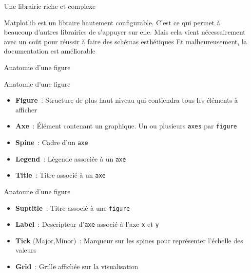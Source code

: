 \begin{frame}{Une librairie riche et complexe}
    \begin{itemize}
        \positem Matplotlib est un libraire hautement configurable. C'est ce qui permet à beaucoup d'autres librairies de s'appuyer sur elle.
        \negitem Mais cela vient nécessairement avec un coût pour réussir à faire des schémas esthétiques
        \negitem Et malheureusement, la documentation est améliorable
    \end{itemize}
    
\end{frame}

\begin{frame}{Anatomie d'une figure}
\end{frame}

\begin{frame}{Anatomie d'une figure}
    \begin{minipage}{0.49\linewidth}
        \begin{itemize}
            \item \textbf{\alert{Figure}}~: Structure de plus haut niveau qui contiendra tous les éléments à afficher
            \item \textbf{\alert{Axe}}~: Élément contenant un graphique. Un ou plusieurs \texttt{axes} par \texttt{figure}
            \item \textbf{\alert{Spine}}~: Cadre d'un \texttt{axe}   
            \item \textbf{\alert{Legend}}~: Légende associée à un \texttt{axe}   
            \item \textbf{\alert{Title}}~: Titre associé à un \texttt{axe}   
        \end{itemize}
    \end{minipage}
    \begin{minipage}{0.49\linewidth}
    \end{minipage}
\end{frame}

\begin{frame}{Anatomie d'une figure}
    \begin{minipage}{0.49\linewidth}
        \begin{itemize}
            \item \textbf{\alert{Suptitle}}~: Titre associé à une \texttt{figure}
            \item \textbf{\alert{Label}}~: Descripteur d'\texttt{axe} associé à l'axe \texttt{x} et \texttt{y}    
            \item \textbf{\alert{Tick}} (Major,Minor)~: Marqueur sur les spines pour représenter l'échelle des valeurs   
            \item \textbf{\alert{Grid}}~: Grille affichée sur la visualisation   
        \end{itemize}
    \end{minipage}
    \begin{minipage}{0.49\linewidth}
    \end{minipage}
\end{frame}

